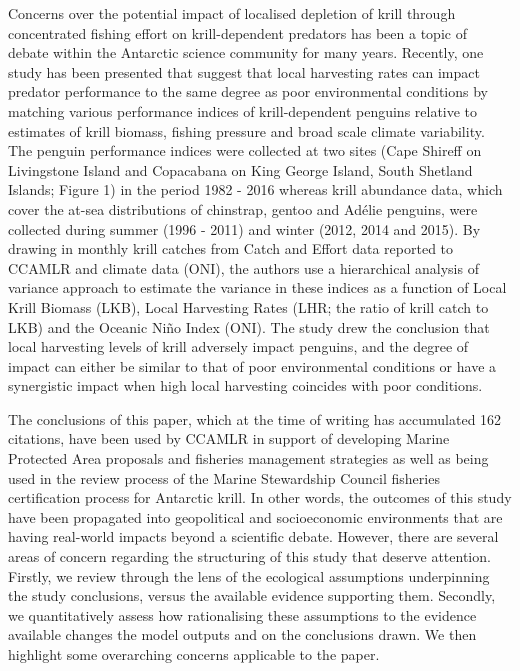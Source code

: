 \documentclass[]{elsarticle} %
\begin{document}
Concerns over the potential impact of localised depletion of krill
through concentrated fishing effort on krill-dependent predators has
been a topic of debate within the Antarctic science community for many
years. Recently, one study has been presented that suggest that local
harvesting rates can impact predator performance to the same degree as
poor environmental conditions \citep{Watters2020} by matching various
performance indices of krill-dependent penguins relative to estimates of
krill biomass, fishing pressure and broad scale climate variability. The
penguin performance indices were collected at two sites (Cape Shireff on
Livingstone Island and Copacabana on King George Island, South Shetland
Islands; Figure 1) in the period 1982 - 2016 whereas krill abundance
data, which cover the at-sea distributions of chinstrap, gentoo and
Adélie penguins, were collected during summer (1996 - 2011) and winter
(2012, 2014 and 2015). By drawing in monthly krill catches from Catch
and Effort data reported to CCAMLR and climate data (ONI), the authors
use a hierarchical analysis of variance approach to estimate the
variance in these indices as a function of Local Krill Biomass (LKB),
Local Harvesting Rates (LHR; the ratio of krill catch to LKB) and the
Oceanic Niño Index (ONI). The study drew the conclusion that local
harvesting levels of krill adversely impact penguins, and the degree of
impact can either be similar to that of poor environmental conditions or
have a synergistic impact when high local harvesting coincides with poor
conditions.

The conclusions of this paper, which at the time of writing has
accumulated 162 citations, have been used by CCAMLR in support of
developing Marine Protected Area proposals and fisheries management
strategies as well as being used in the review process of the Marine
Stewardship Council fisheries certification process for Antarctic krill.
In other words, the outcomes of this study have been propagated into
geopolitical and socioeconomic environments that are having real-world
impacts beyond a scientific debate. However, there are several areas of
concern regarding the structuring of this study that deserve attention.
Firstly, we review \citet{Watters2020} through the lens of the
ecological assumptions underpinning the study conclusions, versus the
available evidence supporting them. Secondly, we quantitatively assess
how rationalising these assumptions to the evidence available changes
the model outputs and on the conclusions drawn. We then highlight some
overarching concerns applicable to the paper.
\end{document}

